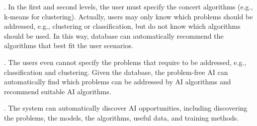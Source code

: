 
. In the first and second levels, the user must specify the concert algorithms (e.g., k-means for clustering). Actually, users may only know which problems should be addressed, e.g., clustering or classification, but do not know which algorithms should be used. In this way, database can automatically recommend the algorithms that best fit the user scenarios.


. The users even cannot specify the problems that require to be addressed, e.g., classification and clustering. Given the database, the problem-free AI can automatically find which problems can be addressed by AI algorithms and recommend suitable AI algorithms. 

. The system can automatically discover AI opportunities, including discovering the problems, the models, the algorithms, useful data,  and training methods.  




